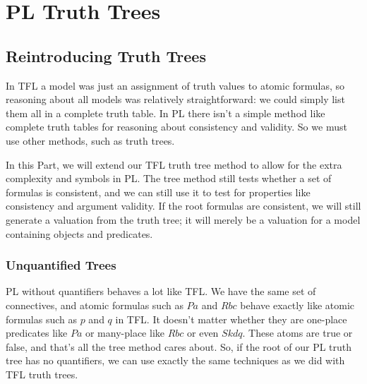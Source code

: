\documentclass[PHIL101-Textbook.tex]{subfiles}
\begin{document}
\part{PL Truth Trees}\label{part:pl.trees}

\chapter{Reintroducing Truth Trees}

In TFL a model was just an assignment of truth values to atomic formulas, so reasoning about all models was relatively straightforward: we could simply list them all in a complete truth table. In PL there isn't a simple method like complete truth tables for reasoning about consistency and validity. So we must use other methods, such as truth trees.

In this Part, we will extend our TFL truth tree method to allow for the extra complexity and symbols in PL. The tree method still tests whether a set of formulas is consistent, and we can still use it to test for properties like consistency and argument validity. If the root formulas are consistent, we will still generate a valuation from the truth tree; it will merely be a valuation for a model containing objects and predicates.




\section{Unquantified Trees}
PL without quantifiers behaves a lot like TFL. We have the same set of connectives, and atomic formulas such as $Pa$ and $Rbc$ behave exactly like atomic formulas such as $p$ and $q$ in TFL. It doesn't matter whether they are one-place predicates like $Pa$ or many-place like $Rbc$ or even $Skdq$. These atoms are true or false, and that's all the tree method cares about. So, if the root of our PL truth tree has no quantifiers, we can use exactly the same techniques as we did with TFL truth trees.
\end{document}
